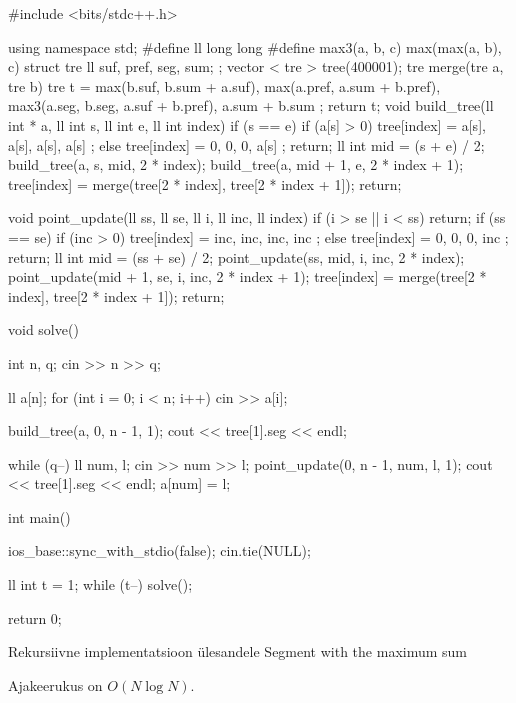 \documentclass{trkut}
\theoremstyle{definition}
\begin{document}
\begin{cclol}
#include <bits/stdc++.h>

using namespace std;
#define ll long long
#define max3(a, b, c) max(max(a, b), c)
struct tre {
  ll suf, pref, seg, sum;
};
vector < tre > tree(400001);
tre merge(tre a, tre b) {
  tre t = {
    max(b.suf, b.sum + a.suf),
    max(a.pref, a.sum + b.pref),
    max3(a.seg, b.seg, a.suf + b.pref),
    a.sum + b.sum
  };
  return t;
}
void build_tree(ll int * a, ll int s, ll int e, ll int index) {
  if (s == e) {
    if (a[s] > 0)
      tree[index] = {
        a[s],
        a[s],
        a[s],
        a[s]
      };
    else
      tree[index] = {
        0,
        0,
        0,
        a[s]
      };
    return;
  }
  ll int mid = (s + e) / 2;
  build_tree(a, s, mid, 2 * index);
  build_tree(a, mid + 1, e, 2 * index + 1);
  tree[index] = merge(tree[2 * index], tree[2 * index + 1]);
  return;
}

void point_update(ll ss, ll  se, ll i, ll inc, ll index) {
  if (i > se || i < ss)
    return;
  if (ss == se) {
    if (inc > 0)
      tree[index] = {
        inc,
        inc,
        inc,
        inc
      };
    else
      tree[index] = {
        0,
        0,
        0,
        inc
      };
    return;
  }
  ll int mid = (ss + se) / 2;
  point_update(ss, mid, i, inc, 2 * index);
  point_update(mid + 1, se, i, inc, 2 * index + 1);
  tree[index] = merge(tree[2 * index], tree[2 * index + 1]);
  return;
}

void solve() {
  int n, q;
  cin >> n >> q;

  ll a[n];
  for (int i = 0; i < n; i++)
    cin >> a[i];

  build_tree(a, 0, n - 1, 1);
  cout << tree[1].seg << endl;

  while (q--) {
    ll num, l;
    cin >> num >> l;
    point_update(0, n - 1, num, l, 1);
    cout << tree[1].seg << endl;
    a[num] = l;
  }

}
int main() {
  ios_base::sync_with_stdio(false);
  cin.tie(NULL);

  ll int t = 1;
  while (t--) {
    solve();
  }

  return 0;
}
\end{cclol}
 \begin{kk}[H]%
    \caption{Rekursiivne implementatsioon ülesandele Segment with the maximum sum}%
    \label{EMaxx}%
    \end{kk}
Ajakeerukus on $O(N\log N)$.
\end{document}
